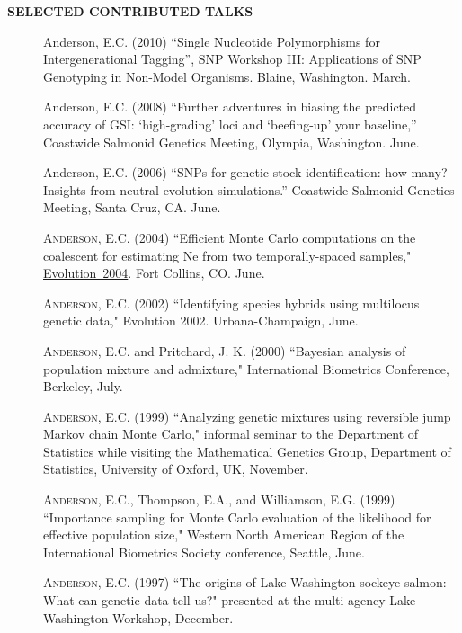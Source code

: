 \documentclass[11pt]{article}
\newlength{\postskip}
\begin{document}
\vspace*{\postskip}
{\bf SELECTED CONTRIBUTED TALKS}
\begin{description}
\item[] {\sc Anderson, E.C.} (2010) ``Single Nucleotide Polymorphisms for Intergenerational Tagging'', SNP Workshop III: Applications of SNP Genotyping in Non-Model Organisms. Blaine, Washington. March.
\item[] {\sc Anderson, E.C.} (2008) ``Further adventures in biasing the predicted accuracy of GSI: `high-grading' loci and `beefing-up' your baseline,'' Coastwide Salmonid Genetics Meeting, Olympia, Washington. June. 
\item[] {\sc Anderson, E.C.} (2006) ``SNPs for genetic stock identification: how many? Insights from neutral-evolution simulations.'' Coastwide Salmonid Genetics Meeting, Santa Cruz, CA. June.
\item[] \textsc{Anderson, E.C.}  (2004) ``Efficient Monte Carlo computations on the coalescent for estimating Ne from two temporally-spaced samples," \href{http://evolution04.biology.colostate.edu/mainframe.html}{Evolution~2004}. Fort Collins, CO. June.
\item[] \textsc{Anderson, E.C.}  (2002) ``Identifying species hybrids using multilocus genetic data,"
Evolution 2002. Urbana-Champaign, June.
\item[] \textsc{Anderson, E.C.} and Pritchard, J. K. (2000) ``Bayesian analysis of population mixture
and admixture," International Biometrics Conference, Berkeley, July.
\item[] \textsc{Anderson, E.C.} (1999) ``Analyzing genetic mixtures using reversible jump Markov chain
Monte Carlo," informal seminar to the Department of Statistics while visiting the Mathematical
Genetics Group, Department of Statistics, University of Oxford, UK, November.
\item[] \textsc{Anderson, E.C.}, Thompson, E.A., and Williamson, E.G. (1999) ``Importance sampling for
Monte Carlo evaluation of the likelihood for effective population size," Western North American
Region of the International Biometrics Society conference, Seattle, June.
\item[] \textsc{Anderson, E.C.} (1997) ``The origins of Lake Washington sockeye salmon: What can
genetic data tell us?" presented at the multi-agency Lake Washington Workshop, December.
\end{description}

\vspace*{\postskip}
\end{document}
